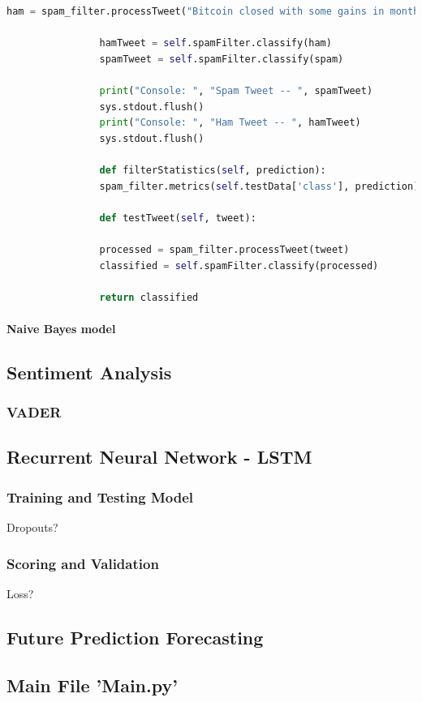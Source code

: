 \documentclass[oneside, 12pt]{article}
\begin{document}
\begin{lstlisting}[language=python, caption=Spam filter training Class]
				ham = spam_filter.processTweet("Bitcoin closed with some gains in month of February")
				
				hamTweet = self.spamFilter.classify(ham)
				spamTweet = self.spamFilter.classify(spam)
				
				print("Console: ", "Spam Tweet -- ", spamTweet)
				sys.stdout.flush()
				print("Console: ", "Ham Tweet -- ", hamTweet)
				sys.stdout.flush()
				
				def filterStatistics(self, prediction):
				spam_filter.metrics(self.testData['class'], prediction)
				
				def testTweet(self, tweet):
				
				processed = spam_filter.processTweet(tweet)
				classified = self.spamFilter.classify(processed)
				
				return classified
				\end{lstlisting}
				
				\paragraph{Naive Bayes model}
		
		\subsection{Sentiment Analysis}
			\subsubsection{VADER}
			
		\subsection{Recurrent Neural Network - LSTM}
			\subsubsection{Training and Testing Model}
			Dropouts?
			\subsubsection{Scoring and Validation}
			Loss?
		\subsection{Future Prediction Forecasting}
		
		
		\subsection{Main File 'Main.py'}
		
\end{document}
